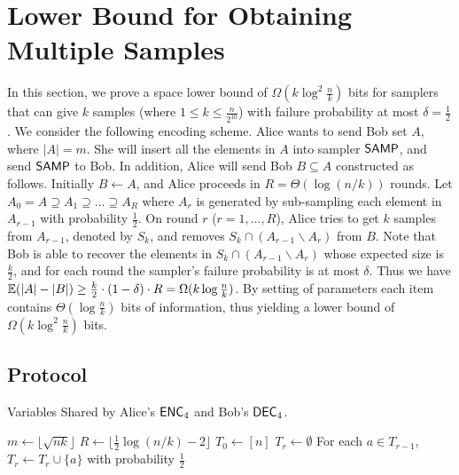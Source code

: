 \section{Lower Bound for Obtaining Multiple Samples}\label{sec:k-samples-lb}

In this section, we prove a space lower bound of $\Omega(k\log^2
\frac{n}{k})$ bits for samplers that can give $k$ samples (where $1\le k \le \frac{n}{2^{10}}$) with failure probability at most $\delta = \frac{1}{2}$.
We consider the following encoding scheme. 
Alice wants to send Bob set $A$, where $|A|=m$. 
She will insert all the elements in $A$ into sampler $\textsf{SAMP}$, and send $\textsf{SAMP}$ to Bob. 
In addition, Alice will send Bob $B\subseteq A$ constructed as follows.
Initially $B\leftarrow A$, and Alice proceeds in $R=\Theta(\log (n/k))$ rounds. 
Let $A_0=A\supseteq A_1\supseteq \ldots \supseteq A_R$ where $A_r$ is generated by sub-sampling each element in $A_{r-1}$ with probability $\frac{1}{2}$. 
On round $r$ ($r=1,\ldots, R$), Alice tries to get $k$ samples from $A_{r-1}$, denoted by $S_k$, and removes $S_k\cap (A_{r-1}\backslash A_{r})$ from $B$. 
Note that Bob is able to recover the elements in $S_k\cap (A_{r-1}\backslash A_{r})$ whose expected size is $\frac{k}{2}$, and for each round the sampler's failure probability is at most $\delta$. 
Thus we have $\operatorname*{\mathbb{E}}(|A|-|B|)\ge \frac{k}{2}\cdot (1-\delta) \cdot R=\Omega(k\log\frac{n}{k})$. By setting of parameters each item contains $\Theta(\log \frac{n}{k})$ bits of information, thus yielding a lower bound of $\Omega(k\log^2\frac{n}{k})$ bits.

\subsection{Protocol}
\begin{algorithm}[H] 
  \caption{Variables Shared by Alice's $\textsf{ENC}_4$ and Bob's $\textsf{DEC}_4$.} \label{algo:para4}
  \begin{algorithmic}[1] 
    \State $m\leftarrow \lfloor \sqrt{nk} \rfloor$
    \State $R\leftarrow \lfloor \frac{1}{2}\log (n/k) - 2 \rfloor$ 
    \State $T_0\leftarrow [n]$
      \State $T_r\leftarrow \emptyset$
      \State For each $a\in T_{r-1}$, $T_r\leftarrow T_r\cup \{a\}$ with probability $\frac{1}{2}$ 
    \EndFor
  \end{algorithmic}
\end{algorithm}

